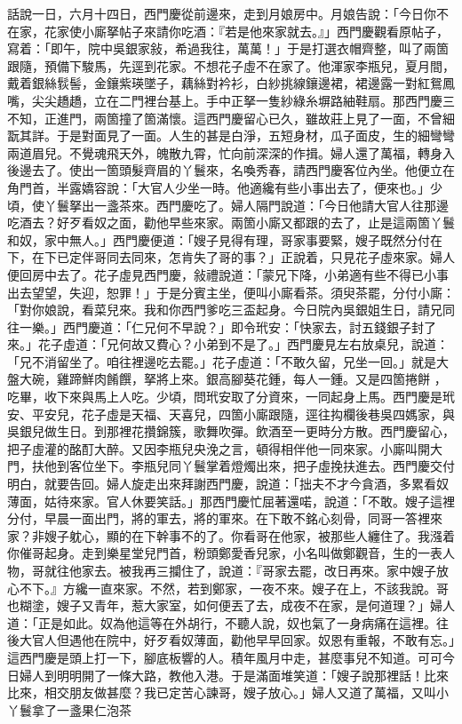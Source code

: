 \begin{showcontents}{}
話說一日，六月十四日，西門慶從前邊來，走到月娘房中。月娘告說：「今日你不在家，花家使小廝拏帖子來請你吃酒：『若是他來家就去。』」西門慶觀看原帖子，寫着：「即午，院中吳銀家敍，希過我往，萬萬！」于是打選衣帽齊整，叫了兩箇跟隨，預備下駿馬，先逕到花家。不想花子虛不在家了。他渾家李瓶兒，夏月間，戴着銀絲䯼髻，金鑲紫瑛墜子，藕絲對衿衫，白紗挑線鑲邊裙，裙邊露一對紅鴛鳳嘴，尖尖趫趫，立在二門裡台基上。手中正拏一隻紗綠糸塀路紬鞋扇。那西門慶三不知，正進門，兩箇撞了箇滿懷。這西門慶留心已久，雖故莊上見了一面，不曾細翫其詳。于是對面見了一面。人生的甚是白淨，五短身材，瓜子面皮，生的細彎彎兩道眉兒。不覺魂飛天外，魄散九霄，忙向前深深的作揖。婦人還了萬福，轉身入後邊去了。使出一箇頭髮齊眉的丫鬟來，名喚秀春，請西門慶客位內坐。他便立在角門首，半露嬌容說：「大官人少坐一時。他適纔有些小事出去了，便來也。」少頃，使丫鬟拏出一盞茶來。西門慶吃了。婦人隔門說道：「今日他請大官人往那邊吃酒去？好歹看奴之面，勸他早些來家。兩箇小廝又都跟的去了，止是這兩箇丫鬟和奴，家中無人。」西門慶便道：「嫂子見得有理，哥家事要緊，嫂子既然分付在下，在下已定伴哥同去同來，怎肯失了哥的事？」正說着，只見花子虛來家。婦人便回房中去了。花子虛見西門慶，敍禮說道：「蒙兄下降，小弟適有些不得已小事出去望望，失迎，恕罪！」于是分賓主坐，便叫小廝看茶。須臾茶罷，分付小廝：「對你娘說，看菜兒來。我和你西門爹吃三盃起身。今日院內吳銀姐生日，請兄同往一樂。」西門慶道：「仁兄何不早說？」即令玳安：「快家去，討五錢銀子封了來。」花子虛道：「兄何故又費心？小弟到不是了。」西門慶見左右放桌兒，說道：「兄不消留坐了。咱往裡邊吃去罷。」花子虛道：「不敢久留，兄坐一回。」就是大盤大碗，雞蹄鮮肉餚饌，拏將上來。銀高腳葵花鍾，每人一鍾。又是四箇捲餅 ，吃畢，收下來與馬上人吃。少頃，問玳安取了分資來，一同起身上馬。西門慶是玳安、平安兒，花子虛是天福、天喜兒，四箇小廝跟隨，逕往抅欄後巷吳四媽家，與吳銀兒做生日。到那裡花攢錦簇，歌舞吹彈。飲酒至一更時分方散。西門慶留心，把子虛灌的酩酊大醉。又因李瓶兒央浼之言，頓得相伴他一同來家。小廝叫開大門，扶他到客位坐下。李瓶兒同丫鬟掌着燈燭出來，把子虛挽扶進去。西門慶交付明白，就要告回。婦人旋走出來拜謝西門慶，說道：「拙夫不才今貪酒，多累看奴薄面，姑待來家。官人休要笑話。」那西門慶忙屈著還喏，說道：「不敢。嫂子這裡分付，早晨一面出門，將的軍去，將的軍來。在下敢不銘心刻骨，同哥一答裡來家？非嫂子躭心，顯的在下幹事不的了。你看哥在他家，被那些人纏住了。我漒着你催哥起身。走到樂星堂兒門首，粉頭鄭愛香兒家，小名叫做鄭觀音，生的一表人物，哥就往他家去。被我再三攔住了，說道：『哥家去罷，改日再來。家中嫂子放心不下。』方纔一直來家。不然，若到鄭家，一夜不來。嫂子在上，不該我說。哥也糊塗，嫂子又青年，惹大家室，如何便丟了去，成夜不在家，是何道理？」婦人道：「正是如此。奴為他這等在外胡行，不聽人說，奴也氣了一身病痛在這裡。往後大官人但遇他在院中，好歹看奴薄面，勸他早早回家。奴恩有重報，不敢有忘。」這西門慶是頭上打一下，腳底板響的人。積年風月中走，甚麼事兒不知道。可可今日婦人到明明開了一條大路，教他入港。于是滿面堆笑道：「嫂子說那裡話！比來比來，相交朋友做甚麼？我已定苦心諫哥，嫂子放心。」婦人又道了萬福，又叫小丫鬟拿了一盞果仁泡茶 
\end{showcontents}
